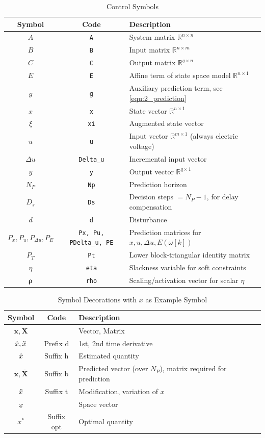 \begin{table}[H]
	\centering
	\caption{Control Symbols}
	\begin{tabular}{c|c|l}
		Symbol & Code & Description \\
		\hline
		$A$ & \verb|A| & System matrix $\mathbb{R}^{n \times n}$ \\
		$B$ & \verb|B| & Input matrix $\mathbb{R}^{n \times m}$ \\
		$C$ & \verb|C| & Output matrix $\mathbb{R}^{q \times n}$ \\
		$E$ & \verb|E| & Affine term of state space model $\mathbb{R}^{n \times 1}$ \\
        $g$ & \verb|g| & Auxiliary prediction term, see \eqref{equ:2_prediction}\\
		${x}$ & \verb|x| & State vector $\mathbb{R}^{n \times 1}$ \\
		$\xi$ & \verb|xi| & Augmented state vector \\
		${u}$ & \verb|u| & Input vector $\mathbb{R}^{m \times 1}$ (always electric voltage) \\
		$\Delta {u}$ & \verb|Delta_u| & Incremental input vector \\
		$y$ & \verb|y| & Output vector $\mathbb{R}^{q \times 1}$ \\
		$N_P$ & \verb|Np| & Prediction horizon \\
        $D_s$ & \verb|Ds| & Decision steps $=N_P-1$, for delay compensation \\
		$d$ & \verb|d| & Disturbance \\
		$P_x, P_u, P_{\Delta u}, P_E$ & \verb|Px, Pu, PDelta_u, PE| & Prediction matrices for $x, u, \Delta u, E(\omega[k])$ \\
		$P_T$ & \verb|Pt| & Lower block-triangular identity matrix \\
		$\eta$ & \verb|eta| & Slackness variable for soft constraints \\
		$\bm{\rho}$ & \verb|rho| & Scaling/activation vector for scalar $\eta$ \\
	\end{tabular}
\end{table}


\begin{table}[H]
	\centering
	\caption{Symbol Decorations with $x$ as Example Symbol}
	\begin{tabular}{c|c|l}
		Symbol & Code & Description \\
		\hline
		$\boldsymbol{x}, \boldsymbol{X}$ & & Vector, Matrix \\
		$\Dot{x}, \Ddot{x}$ & Prefix d & 1st, 2nd time derivative \\
		$\Hat{x}$ & Suffix h & Estimated quantity \\
		$\overline{\boldsymbol{x}}, \overline{\boldsymbol{X}}$ & Suffix b & Predicted vector (over $N_P$), matrix required for prediction \\
		$\Tilde{x}$ & Suffix t & Modification, variation of $x$ \\
		$\underline{x}$ & & Space vector \\
		$x^*$ & Suffix opt & Optimal quantity \\
	\end{tabular}
\end{table}

